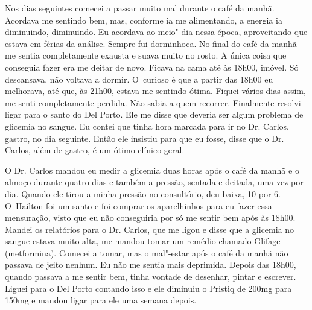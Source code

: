 Nos dias seguintes comecei a passar muito mal durante o café da manhã.
Acordava me sentindo bem, mas, conforme ia me alimentando, a energia ia
diminuindo, diminuindo. Eu acordava ao meio"-dia nessa época,
aproveitando que estava em férias da análise. Sempre fui dorminhoca. No
final do café da manhã me sentia completamente exausta e suava muito no
rosto. A única coisa que conseguia fazer era me deitar de novo. Ficava
na cama até às 18h00, imóvel. Só descansava, não voltava a dormir. O~curioso é que a partir das 18h00 eu melhorava, até que, às 21h00, estava
me sentindo ótima. Fiquei vários dias assim, me senti completamente
perdida. Não sabia a quem recorrer. Finalmente resolvi ligar para o
santo do Del Porto. Ele me disse que deveria ser algum problema de
glicemia no sangue. Eu contei que tinha hora marcada para ir no Dr.
Carlos, gastro, no dia seguinte. Então ele insistiu para que eu fosse,
disse que o Dr. Carlos, além de gastro, é um ótimo clínico geral.

O Dr. Carlos mandou eu medir a glicemia duas horas após o café da manhã
e o almoço durante quatro dias e também a pressão, sentada e deitada,
uma vez por dia. Quando ele tirou a minha pressão no consultório, deu
baixa, 10 por 6. O~Hailton foi um santo e foi comprar os aparelhinhos
para eu fazer essa mensuração, visto que eu não conseguiria por só me
sentir bem após às 18h00. Mandei os relatórios para o Dr. Carlos, que me
ligou e disse que a glicemia no sangue estava muito alta, me mandou
tomar um remédio chamado Glifage (metformina). Comecei a tomar, mas o
mal"-estar após o café da manhã não passava de jeito nenhum. Eu não me
sentia mais deprimida. Depois das 18h00, quando passava a me sentir bem,
tinha vontade de desenhar, pintar e escrever. Liguei para o Del Porto
contando isso e ele diminuiu o Pristiq de 200mg para 150mg e mandou
ligar para ele uma semana depois.

